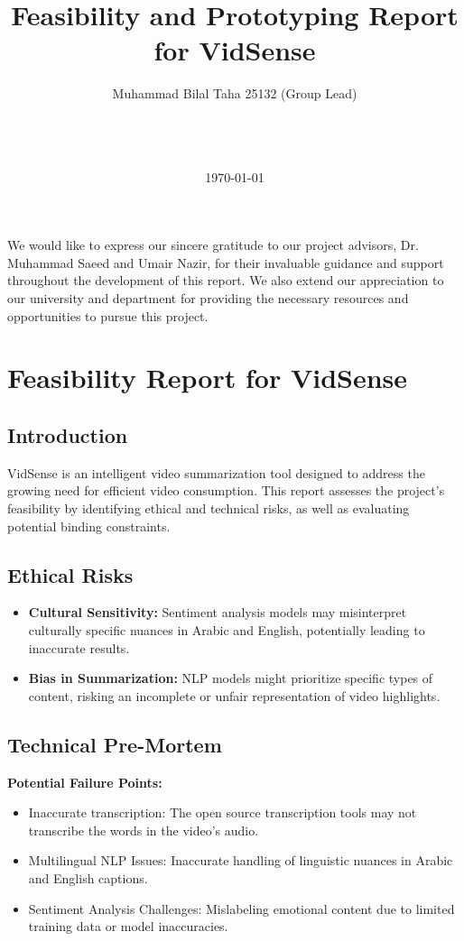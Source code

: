 \documentclass{bscs}
\title{Feasibility and Prototyping Report for VidSense}
\author {Muhammad Bilal Taha 25132 (Group Lead)\\
         [Muhammad Muaz Arif]\\
         [Muhammad Wasay]\\
         [Syed Bilal Ali]\\
         [Ali Iqbal]}
\date{\today}
\begin{document}
\maketitle

\begin{acknowledgement}
We would like to express our sincere gratitude to our project advisors, Dr. Muhammad Saeed
and Umair Nazir, for their invaluable guidance and support throughout the development of this
report. We also extend our appreciation to our university and department for providing the
necessary resources and opportunities to pursue this project.
\end{acknowledgement}

\tableofcontents
\newpage

\section{Feasibility Report for VidSense}
\subsection{Introduction}
VidSense is an intelligent video summarization tool designed to address the growing need for efficient video consumption. This report assesses the project's feasibility by identifying ethical and technical risks, as well as evaluating potential binding constraints.

\subsection{Ethical Risks}
\begin{itemize}
     
    \item \textbf{Cultural Sensitivity:} Sentiment analysis models may misinterpret culturally specific nuances in Arabic and English, potentially leading to inaccurate results.
    \item \textbf{Bias in Summarization:} NLP models might prioritize specific types of content, risking an incomplete or unfair representation of video highlights.
\end{itemize}

\subsection{Technical Pre-Mortem}
\textbf{Potential Failure Points:}
\begin{itemize}
\item Inaccurate transcription: The open source transcription tools may not transcribe the words in the video's audio. 

    \item Multilingual NLP Issues: Inaccurate handling of linguistic nuances in Arabic and English captions.
    \item Sentiment Analysis Challenges: Mislabeling emotional content due to limited training data or model inaccuracies.
\end{itemize}
\end{document}
